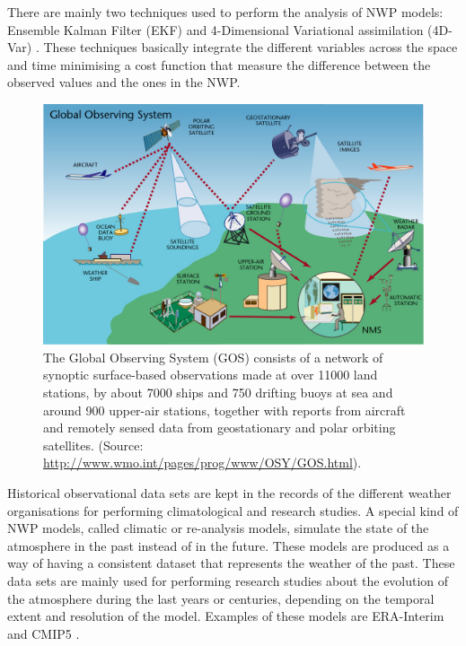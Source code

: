\medskip

There are mainly two techniques used to perform the analysis of NWP models: Ensemble Kalman Filter (EKF) \citep{burgers1998analysis} and 4-Dimensional Variational assimilation (4D-Var) \citep{courtier1994strategy}. These techniques basically integrate the different variables across the space and time minimising a cost function that measure the difference between the observed values and the ones in the NWP.

\medskip

\begin{figure}[h]
	\centerline{\includegraphics[width=12cm]{GOS-fullsize.jpg}} \caption{ The Global Observing System (GOS) consists of a network of synoptic surface-based observations made at over 11000 land stations, by about 7000 ships and 750 drifting buoys at sea and around 900 upper-air stations, together with reports from aircraft and remotely sensed data from geostationary and polar orbiting satellites. (Source: \url{http://www.wmo.int/pages/prog/www/OSY/GOS.html}).}\label{gos_wmo}
\end{figure}

Historical observational data sets are kept in the records of the different weather organisations for performing climatological and research studies. A special kind of NWP models, called climatic or re-analysis models, simulate the state of the atmosphere in the past instead of in the future. These models are produced as a way of having a consistent dataset that represents the weather of the past. These data sets are mainly used for performing research studies about the evolution of the atmosphere during the last years or centuries, depending on the temporal extent and resolution of the model. Examples of these models are ERA-Interim \citep{dee2011era} and CMIP5 \citep{taylor2012overview}.  

